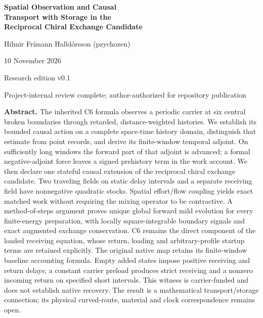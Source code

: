 \documentclass[11pt,a4paper]{article}
\theoremstyle{definition}\newtheorem{theorem}{Theorem}[section]
\theoremstyle{definition}\newtheorem{definition}[theorem]{Definition}
\theoremstyle{remark}\newtheorem{remark}[theorem]{Remark}
\begin{document}
\hypersetup{pageanchor=false}
\begin{titlepage}\centering
\vspace*{10mm}
{\LARGE\bfseries Spatial Observation and Causal\\[3mm]Transport with Storage in the\\[3mm]Reciprocal Chiral Exchange Candidate\par}
\vspace{10mm}
{\large Hilmir Frímann Halldórsson (pzychozen)\par}\vspace{4mm}
{10 November 2026\par}\vspace{5mm}
{\small Research edition v0.1\par Project-internal review complete; author-authorized for repository publication\par}
\vspace{9mm}
\begin{minipage}{0.94\textwidth}
\textbf{Abstract.}
The inherited C6 formula observes a periodic carrier at six central broken boundaries through retarded, distance-weighted histories. We establish its bounded causal action on a complete space-time history domain, distinguish that estimate from point records, and derive its finite-window temporal adjoint. On sufficiently long windows the forward part of that adjoint is advanced; a formal negative-adjoint force leaves a signed prehistory term in the work account. We then declare one stateful causal extension of the reciprocal chiral exchange candidate. Two traveling fields on static delay intervals and a separate receiving field have nonnegative quadratic stocks. Spatial effort/flow coupling yields exact matched work without requiring the mixing operator to be contractive. A method-of-steps argument proves unique global forward mild evolution for every finite-energy preparation, with locally square-integrable boundary signals and exact augmented exchange conservation. C6 remains the direct component of the loaded receiving equation, whose return, loading and arbitrary-profile startup terms are retained explicitly. The original native map retains its finite-window baseline accounting formula. Empty added states impose positive receiving and return delays; a constant carrier preload produces strict receiving and a nonzero incoming return on specified short intervals. This witness is carrier-funded and does not establish native recovery. The result is a mathematical transport/storage connection; its physical curved-route, material and clock correspondence remains open.

\end{minipage}
\end{titlepage}
\end{document}
